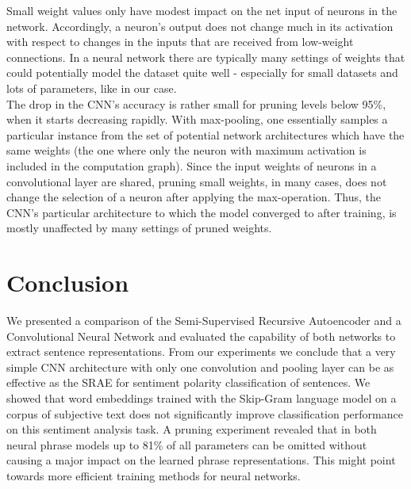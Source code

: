 \documentclass{llncs}
\begin{document}
Small weight values only have modest impact on the net input of neurons in the network. Accordingly, a neuron's output does not change much in its activation with respect to changes in the inputs that are received from low-weight connections. In a neural network there are typically many settings of weights that could potentially model the dataset quite well - especially for small datasets and lots of parameters, like in our case.\\
The drop in the CNN's accuracy is rather small for pruning levels below 95\%, when it starts decreasing rapidly. With max-pooling, one essentially samples a particular instance from the set of potential network architectures which have the same weights (the one where only the neuron with maximum activation is included in the computation graph). Since the input weights of neurons in a convolutional layer are shared, pruning small weights, in many cases, does not change the selection of a neuron after applying the max-operation. Thus, the CNN's particular architecture to which the model converged to after training, is mostly unaffected by many settings of pruned weights.

\section{Conclusion}
We presented a comparison of the Semi-Supervised Recursive Autoencoder and a Convolutional Neural Network and evaluated the capability of both networks to extract sentence representations. From our experiments we conclude that a very simple CNN architecture with only one convolution and pooling layer can be as effective as the SRAE for sentiment polarity classification of sentences. We showed that word embeddings trained with the Skip-Gram language model on a corpus of subjective text does not significantly improve classification performance on this sentiment analysis task. A pruning experiment revealed that in both neural phrase models up to 81\% of all parameters can be omitted without causing a major impact on the learned phrase representations. This might point towards more efficient training methods for neural networks.
\end{document}
